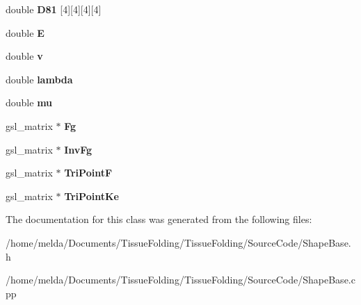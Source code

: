 \begin{DoxyCompactItemize}
\item 
\hypertarget{classShapeBase_abafc7c3b44ef3be78d4be880406bbc5f}{}double {\bfseries D81} \mbox{[}4\mbox{]}\mbox{[}4\mbox{]}\mbox{[}4\mbox{]}\mbox{[}4\mbox{]}\label{classShapeBase_abafc7c3b44ef3be78d4be880406bbc5f}

\item 
\hypertarget{classShapeBase_a6c1a3a0173841d6072a5268978463ff2}{}double {\bfseries E}\label{classShapeBase_a6c1a3a0173841d6072a5268978463ff2}

\item 
\hypertarget{classShapeBase_a8b4c2d3bfbc6c9785c5181a56f929151}{}double {\bfseries v}\label{classShapeBase_a8b4c2d3bfbc6c9785c5181a56f929151}

\item 
\hypertarget{classShapeBase_aa16b41d5791fc15531cbee067c502a5d}{}double {\bfseries lambda}\label{classShapeBase_aa16b41d5791fc15531cbee067c502a5d}

\item 
\hypertarget{classShapeBase_ac5819d0d117e5510611259177c477af8}{}double {\bfseries mu}\label{classShapeBase_ac5819d0d117e5510611259177c477af8}

\item 
\hypertarget{classShapeBase_a4156d7c7f91f0b528214b74277279df0}{}gsl\+\_\+matrix $\ast$ {\bfseries Fg}\label{classShapeBase_a4156d7c7f91f0b528214b74277279df0}

\item 
\hypertarget{classShapeBase_afe7cb600a9316597a16512ab7b6fcd6f}{}gsl\+\_\+matrix $\ast$ {\bfseries Inv\+Fg}\label{classShapeBase_afe7cb600a9316597a16512ab7b6fcd6f}

\item 
\hypertarget{classShapeBase_ab7ac8f14929ab37e8eae5fcaf93b18a8}{}gsl\+\_\+matrix $\ast$ {\bfseries Tri\+Point\+F}\label{classShapeBase_ab7ac8f14929ab37e8eae5fcaf93b18a8}

\item 
\hypertarget{classShapeBase_ace20710f27099833509c474b221c25df}{}gsl\+\_\+matrix $\ast$ {\bfseries Tri\+Point\+Ke}\label{classShapeBase_ace20710f27099833509c474b221c25df}

\end{DoxyCompactItemize}


The documentation for this class was generated from the following files\+:\begin{DoxyCompactItemize}
\item 
/home/melda/\+Documents/\+Tissue\+Folding/\+Tissue\+Folding/\+Source\+Code/Shape\+Base.\+h\item 
/home/melda/\+Documents/\+Tissue\+Folding/\+Tissue\+Folding/\+Source\+Code/Shape\+Base.\+cpp\end{DoxyCompactItemize}
